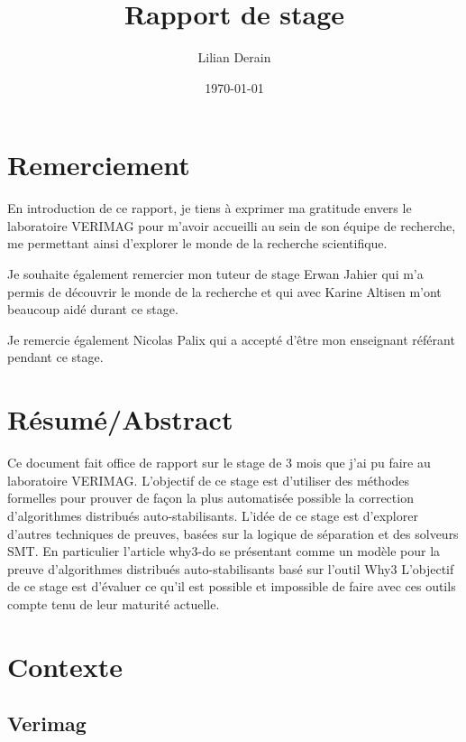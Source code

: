 \documentclass[11pt]{article}
\author{Lilian Derain}
\date{\today}
\title{Rapport de stage}
\begin{document}
\maketitle


\section{Remerciement}
\label{sec:orgeb93dc6}
  En introduction de ce rapport, je tiens à exprimer ma gratitude envers le laboratoire
VERIMAG pour m’avoir accueilli au sein de son équipe de recherche, me
permettant ainsi d’explorer le monde de la recherche scientifique.

Je souhaite également remercier mon tuteur de stage Erwan Jahier qui m'a permis de découvrir le 
monde de la recherche et qui avec Karine Altisen m'ont beaucoup aidé durant ce stage.

Je remercie également Nicolas Palix qui a accepté d’être mon enseignant référant pendant
ce stage. 


\section{Résumé/Abstract}
\label{sec:org8c3a98a}
Ce document fait office de rapport sur le stage de 3 mois que j'ai pu faire au laboratoire VERIMAG. 
L'objectif de ce stage est d'utiliser des méthodes formelles pour prouver de façon la plus automatisée possible la correction d'algorithmes distribués auto-stabilisants.
L'idée de ce stage est d'explorer d'autres techniques de preuves, basées sur la logique de séparation et  des solveurs SMT. 
En particulier l'article why3-do se présentant comme un modèle pour la preuve d'algorithmes distribués auto-stabilisants basé sur l'outil Why3  
L'objectif de ce stage  est d'évaluer ce qu'il est possible et impossible  de faire  avec ces  outils compte  tenu de  leur maturité actuelle.

\section{Contexte}
\label{sec:org8981488}

\subsection{Verimag}
\label{sec:orge272d40}
\end{document}
